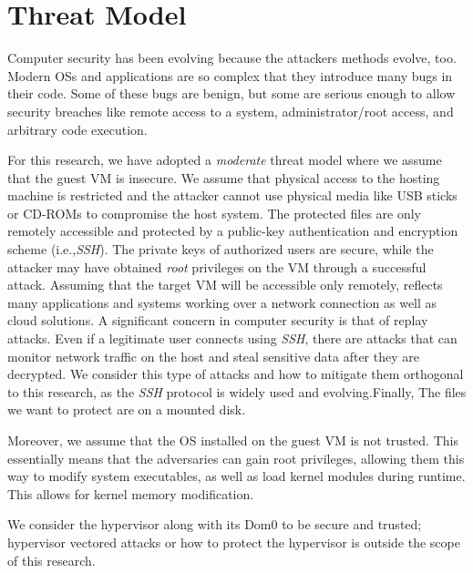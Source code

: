 \section{Threat Model}\label{sec:threat}

Computer security has been evolving because the attackers methods evolve, too. Modern \acp{OS} and applications are so complex that they introduce many bugs in their code. Some of these bugs are benign, but some are serious enough to allow security breaches like remote access to a system, administrator/root access, and arbitrary code execution.

\par For this research, we have adopted a \emph{moderate} threat model where we assume that the guest \ac{VM} is insecure. We assume that physical access to the hosting machine is restricted and the attacker cannot use physical media like USB sticks or CD-ROMs to compromise the host system. The protected files are only remotely accessible and protected  by  a  public-key  authentication  and  encryption scheme (i.e.,\emph{SSH}). The  private  keys  of  authorized  users  are  secure, while the attacker may have obtained \emph{root} privileges on the \ac{VM} through a successful attack. Assuming that the target \ac{VM} will be accessible only remotely, reflects many applications and systems working over a network connection as well as cloud solutions. A significant  concern  in  computer security is that of replay attacks. Even if a legitimate user connects using \emph{SSH}, there are attacks that can monitor  network  traffic  on  the  host  and  steal  sensitive data after they are decrypted. We consider this type of attacks and how to mitigate them orthogonal to this research, as the \emph{SSH} protocol is widely used and evolving.Finally, The files we want to protect are on a mounted disk.

\par Moreover, we assume that the \ac{OS} installed on the guest \ac{VM} is not trusted. This essentially means that the adversaries can gain root privileges, allowing them this way to modify system executables, as well as load kernel modules during runtime. This allows for kernel memory modification.

\par We consider the hypervisor along with its Dom0 to be secure and trusted; hypervisor vectored attacks or how to protect the hypervisor is outside the scope of this research.

